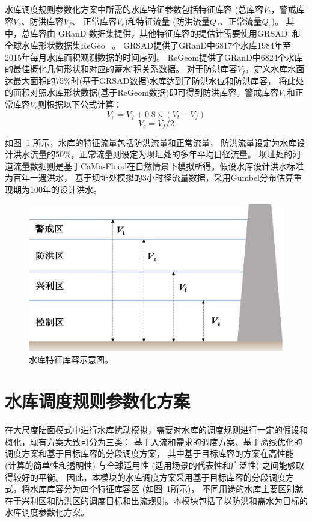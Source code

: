 水库调度规则参数化方案中所需的水库特征参数包括特征库容 (总库容$V_t$，警戒库容$V_e$、防洪库容$V_f$、
正常库容$V_c$)和特征流量 (防洪流量$Q_f$、正常流量$Q_c$)。
其中，总库容由 GRanD 数据集提供，其他特征库容的提估计需要使用GRSAD~\citep{zhao2019towards}和全球水库形状数据集ReGeo~\citep{yigzaw2018new} 。
GRSAD提供了GRanD中6817个水库1984年至2015年每月水库面积观测数据的时间序列。
ReGeom提供了GRanD中6824个水库的最佳概化几何形状和对应的蓄水\~面积关系数据。
对于防洪库容$V_f$，定义水库水面达最大面积的75\%时(基于GRSAD数据)水库达到了防洪水位和防洪库容，
将此处的面积对照水库形状数据(基于ReGeom数据)即可得到防洪库容。警戒库容$V_e$和正常库容$V_c$则根据以下公式计算：
\begin{equation}
V_{e}=V_{f}+0.8 \times\left(V_{t}-V_{f}\right)
\end{equation}
\begin{equation}
V_{c}=V_{f} / 2
\end{equation}


如图~\ref{fig:水库特征库容示意图} 所示，水库的特征流量包括防洪流量和正常流量，
防洪流量设定为水库设计洪水流量的50\%，正常流量则设定为坝址处的多年平均日径流量。
坝址处的河道流量数据则是基于CaMa-Flood在自然情景下模拟所得。假设水库设计洪水标准为百年一遇洪水，
基于坝址处模拟的3小时径流量数据，采用Gumbel分布估算重现期为100年的设计洪水\citep{boulange2021}。

{
\begin{figure}[]
\centering
\includegraphics{Figures/陆地表面的水分循环/水库特征库容示意图.png}
\caption{水库特征库容示意图。}
\label{fig:水库特征库容示意图}
\end{figure}
}
\section{水库调度规则参数化方案}
在大尺度陆面模式中进行水库扰动模拟，需要对水库的调度规则进行一定的假设和概化，现有方案大致可分为三类：
基于入流和需求的调度方案、基于离线优化的调度方案和基于目标库容的分段调度方案，
其中基于目标库容的方案在高性能 (计算的简单性和透明性) 与全球适用性 (适用场景的代表性和广泛性) 之间能够取得较好的平衡\citep{yassin2019representation}。
因此，本模块的水库调度方案采用基于目标库容的分段调度方式，将水库库容分为四个特征库容区 (如图~\ref{fig:水库特征库容示意图}所示)，
不同用途的水库主要区别就在于兴利区和防洪区的调度目标和出流规则。本模块包括了以防洪和需水为目标的水库调度参数化方案。


